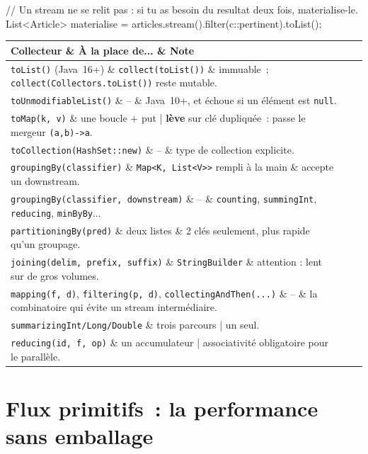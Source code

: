 \documentclass[12pt,a4paper,twoside,openright]{book}
\makeatletter
\newenvironment{tabz}[1]{\rowcolors{2}{white}{tralight}%
  \small\setlength{\tabcolsep}{5pt}\setlength{\LTpre}{3pt}\setlength{\LTpost}{3pt}%
  \begin{longtable}{@{}#1@{}}\toprule}
  {\bottomrule\end{longtable}\normalfont\setlength{\tabcolsep}{6pt}}
\newcommand{\thd}[1]{\textbf{\color{white}#1}}
\newcommand{\headrow}{\rowcolor{theadbg}}
\makeatother
\begin{document}
\begin{codejava}
// Un stream ne se relit pas : si tu as besoin du resultat deux fois, materialise-le.
List<Article> materialise = articles.stream().filter(c::pertinent).toList();
\end{codejava}

\begin{tabz}{lXl}
  \headrow \thd{Collecteur} \& \thd{\`A la place de...} \& \thd{Note} \\
  \midrule
  \verb|toList()| (Java~16+) \& \verb|collect(toList())| \& immuable~; \verb|collect(Collectors.toList())| reste mutable. \\
  \verb|toUnmodifiableList()| \& -- \& Java~10+, et \'echoue si un \'el\'ement est \verb|null|. \\
  \verb|toMap(k, v)| \& une boucle + put | \textbf{l\`eve} sur cl\'e dupliqu\'ee~: passe le mergeur \verb|(a,b)->a|. \\
  \verb|toCollection(HashSet::new)| \& -- \& type de collection explicite. \\
  \verb|groupingBy(classifier)| \& \verb|Map<K, List<V>>| rempli \`a la main \& accepte un downstream. \\
  \verb|groupingBy(classifier, downstream)| \& -- \& \verb|counting|, \verb|summingInt|, \verb|reducing|, \verb|minByBy|... \\
  \verb|partitioningBy(pred)| \& deux listes \& 2 cl\'es seulement, plus rapide qu'un groupage. \\
  \verb|joining(delim, prefix, suffix)| \& \verb|StringBuilder| \& attention : lent sur de gros volumes. \\
  \verb|mapping(f, d)|, \verb|filtering(p, d)|, \verb|collectingAndThen(...)| \& -- \& la combinatoire qui \'evite un stream interm\'ediaire. \\
  \verb|summarizingInt/Long/Double| \& trois parcours | un seul. \\
  \verb|reducing(id, f, op)| \& un accumulateur | associativit\'e obligatoire pour le parall\`ele. \\
\end{tabz}

\section{Flux primitifs~: la performance sans emballage}
\end{document}
